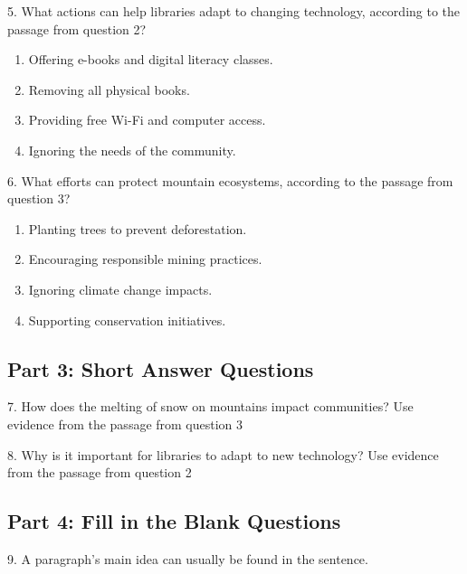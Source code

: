 \documentclass[12pt]{article}
\begin{document}
\vspace{1cm}

5. What actions can help libraries adapt to changing technology, according to the passage from question 2?\\
\begin{enumerate}[label=\Alph*.]
    \item Offering e-books and digital literacy classes.  
    \item Removing all physical books.  
    \item Providing free Wi-Fi and computer access.  
    \item Ignoring the needs of the community.  
\end{enumerate}

\vspace{1cm}

6. What efforts can protect mountain ecosystems, according to the passage from question 3?\\
\begin{enumerate}[label=\Alph*.]
    \item Planting trees to prevent deforestation.  
    \item Encouraging responsible mining practices.  
    \item Ignoring climate change impacts.  
    \item Supporting conservation initiatives.  
\end{enumerate}

\vspace{1cm}

\subsection*{Part 3: Short Answer Questions}

7. How does the melting of snow on mountains impact communities? Use evidence from the passage from question 3\\
\vspace{4cm}

8. Why is it important for libraries to adapt to new technology? Use evidence from the passage from question 2\\
\vspace{4cm}

\subsection*{Part 4: Fill in the Blank Questions}
\vspace{1cm}
9. A paragraph's main idea can usually be found in the  \underline{\hspace{4cm}} sentence.
\end{document}
